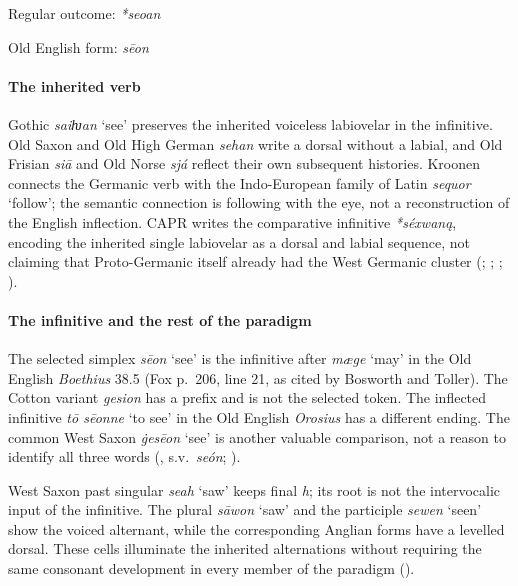 \documentclass[
  british,
  a4paper,
]{article}
\providecommand{\Recon}[1]{\emph{*#1}}
\begin{document}
Regular outcome: \Recon{seoan}

Old English form: \emph{sēon}

\paragraph{The inherited verb}\label{the-inherited-verb}

Gothic \emph{saiƕan} `see' preserves the inherited voiceless labiovelar
in the infinitive. Old Saxon and Old High German \emph{sehan} write a
dorsal without a labial, and Old Frisian \emph{siā} and Old Norse
\emph{sjá} reflect their own subsequent histories. Kroonen connects the
Germanic verb with the Indo-European family of Latin \emph{sequor}
`follow'; the semantic connection is following with the eye, not a
reconstruction of the English inflection. CAPR writes the comparative
infinitive \emph{*séxwaną}, encoding the inherited single labiovelar as
a dorsal and labial sequence, not claiming that Proto-Germanic itself
already had the West Germanic cluster
(;
;
;
).

\paragraph{The infinitive and the rest of the
paradigm}\label{the-infinitive-and-the-rest-of-the-paradigm}

The selected simplex {\emph{sēon}} `see' is the infinitive after
\emph{mæge} `may' in the Old English \emph{Boethius} 38.5 (Fox p.~206,
line 21, as cited by Bosworth and Toller). The Cotton variant
\emph{gesion} has a prefix and is not the selected token. The inflected
infinitive \emph{tō sēonne} `to see' in the Old English \emph{Orosius}
has a different ending. The common West Saxon \emph{ġesēon} `see' is
another valuable comparison, not a reason to identify all three words
(,
s.v.~\emph{seón}; ).

West Saxon past singular \emph{seah} `saw' keeps final \emph{h}; its
root is not the intervocalic input of the infinitive. The plural
\emph{sāwon} `saw' and the participle \emph{sewen} `seen' show the
voiced alternant, while the corresponding Anglian forms have a levelled
dorsal. These cells illuminate the inherited alternations without
requiring the same consonant development in every member of the paradigm
().
\end{document}
